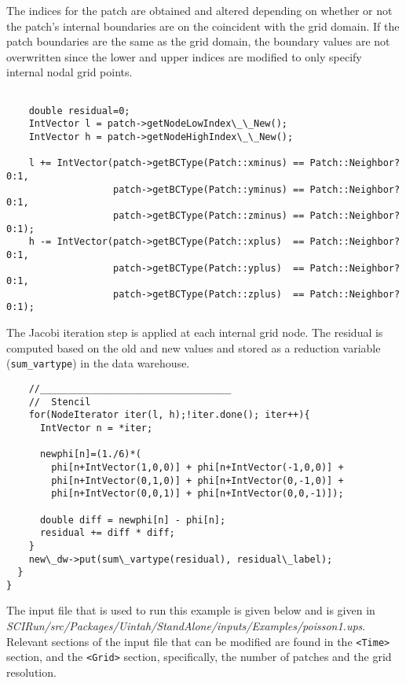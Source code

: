 \documentclass[12pt]{report}
\begin{document}
The indices for the patch are obtained and altered depending on
whether or not the patch's internal boundaries are on the coincident
with the grid domain.  If the patch boundaries are the same as the
grid domain, the boundary values are not overwritten since the lower
and upper indices are modified to only specify internal nodal grid
points.



\begin{verbatim}

    double residual=0;
    IntVector l = patch->getNodeLowIndex\_\_New();
    IntVector h = patch->getNodeHighIndex\_\_New();

    l += IntVector(patch->getBCType(Patch::xminus) == Patch::Neighbor?0:1,
                   patch->getBCType(Patch::yminus) == Patch::Neighbor?0:1,
                   patch->getBCType(Patch::zminus) == Patch::Neighbor?0:1);
    h -= IntVector(patch->getBCType(Patch::xplus)  == Patch::Neighbor?0:1,
                   patch->getBCType(Patch::yplus)  == Patch::Neighbor?0:1,
                   patch->getBCType(Patch::zplus)  == Patch::Neighbor?0:1);

\end{verbatim}

The Jacobi iteration step is applied at each internal grid node.  The
residual is computed based on the old and new values and stored as a
reduction variable (\texttt{sum\_vartype}) in the data warehouse.

\begin{verbatim}
    //__________________________________
    //  Stencil
    for(NodeIterator iter(l, h);!iter.done(); iter++){
      IntVector n = *iter;

      newphi[n]=(1./6)*(
        phi[n+IntVector(1,0,0)] + phi[n+IntVector(-1,0,0)] +
        phi[n+IntVector(0,1,0)] + phi[n+IntVector(0,-1,0)] +
        phi[n+IntVector(0,0,1)] + phi[n+IntVector(0,0,-1)]);

      double diff = newphi[n] - phi[n];
      residual += diff * diff;
    }
    new\_dw->put(sum\_vartype(residual), residual\_label);
  }
}

\end{verbatim}

The input file that is used to run this example is given below and is
given in
\emph{SCIRun/src/Packages/Uintah/StandAlone/inputs/Examples/poisson1.ups}.
Relevant sections of the input file that can be modified are found in
the \texttt{<Time>} section, and the \texttt{<Grid>} section,
specifically, the number of patches and the grid resolution.
\end{document}
